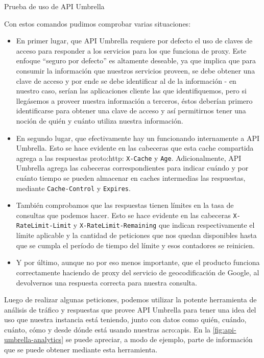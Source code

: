 \begin{listing}[H]
  \caption{Prueba de uso de API Umbrella}
  \label{soa:tecnologias:api-umbrella:bash-pruebas}
\end{listing}

Con estos comandos pudimos comprobar varias situaciones:

\begin{itemize}
  \item En primer lugar, que API Umbrella requiere por defecto el uso de claves de acceso para responder a los servicios para los que funciona de proxy. Este enfoque ``seguro por defecto'' es altamente deseable, ya que implica que para consumir la información que nuestros servicios proveen, se debe obtener una clave de acceso y por ende se debe identificar al  de la información - en nuestro caso, serían las aplicaciones cliente las que identifiquemos, pero si llegásemos a proveer nuestra información a terceros, éstos deberían primero identificarse para obtener una clave de acceso y así permitirnos tener una noción de quién y cuánto utiliza nuestra información.
  \item En segundo lugar, que efectivamente hay un  funcionando internamente a API Umbrella. Esto se hace evidente en las cabeceras que esta cache compartida agrega a las respuestas \gls{proto:http}: \texttt{X-Cache} y \texttt{Age}. Adicionalmente, API Umbrella agrega las cabeceras correspondientes para indicar cuándo y por cuánto tiempo se pueden almacenar en caches intermedias las respuestas, mediante \texttt{Cache-Control} y \texttt{Expires}.
  \item También comprobamos que las respuestas tienen límites en la tasa de consultas que podemos hacer. Esto se hace evidente en las cabeceras \texttt{X-RateLimit-Limit} y \texttt{X-RateLimit-Remaining} que indican respectivamente el límite aplicable y la cantidad de peticiones que nos quedan disponibles hasta que se cumpla el período de tiempo del límite y esos contadores se reinicien.
  \item Y por último, aunque no por eso menos importante, que el producto funciona correctamente haciendo de proxy del servicio de geocodificación de Google, al devolvernos una respuesta correcta para nuestra consulta.
\end{itemize}

Luego de realizar algunas peticiones, podemos utilizar la potente herramienta de análisis de tráfico y respuestas que provee API Umbrella para tener una idea del uso que nuestra instancia está teniendo, junto con datos como quién, cuándo, cuánto, cómo y desde dónde está usando nuestras \glspl{acro:api}. En la \autoref{fig:api-umbrella-analytics} se puede apreciar, a modo de ejemplo, parte de información que se puede obtener mediante esta herramienta.

